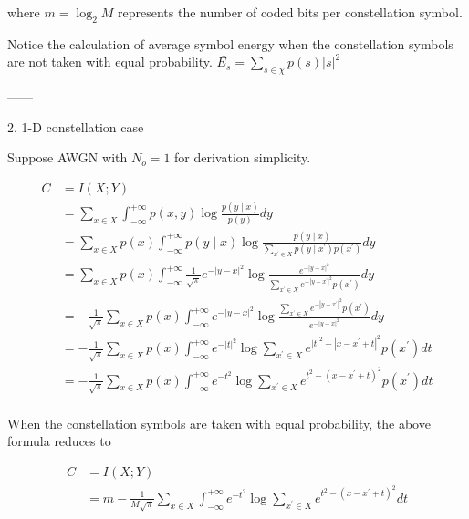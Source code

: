 \documentclass[12pt,a4paper]{article}
\begin{document}
where $m=\log_2M$ represents the number of coded bits per constellation symbol.

Notice the calculation of average symbol energy when the constellation symbols are not taken with equal probability.
$\bar{E_s}=\sum_{s\in \chi}p(s)|s|^2$

------



2. 1-D constellation case

Suppose AWGN with $N_o=1$ for derivation simplicity.

\begin{equation}
    \begin{split}
        C&=I(X;Y)\\
        &=\sum_{x\in X}\int_{-\infty}^{+\infty}p(x,y)\log\frac{p(y\mid x)}{p(y)}dy\\
        &=\sum_{x\in X}p(x)\int_{-\infty}^{+\infty}p(y\mid x)\log\frac{p(y\mid x)}{\sum_{x^\prime\in X}p(y\mid x^\prime)p(x^\prime)}dy\\
        &=\sum_{x\in X}p(x)\int_{-\infty}^{+\infty}\frac{1}{\sqrt{\pi}}e^{-|y-x|^2}\log\frac{e^{-|y-x|^2}}{\sum_{x^\prime\in X}e^{-|y-x^\prime|^2}p(x^\prime)}dy\\
        &=-\frac{1}{\sqrt{\pi}}\sum_{x\in X}p(x)\int_{-\infty}^{+\infty}e^{-|y-x|^2}\log\frac{\sum_{x^\prime\in X}e^{-|y-x^\prime|^2}p(x^\prime)}{e^{-|y-x|^2}}dy\\
        &=-\frac{1}{\sqrt{\pi}}\sum_{x\in X}p(x)\int_{-\infty}^{+\infty}e^{-|t|^2}\log{\sum_{x^\prime\in X}e^{|t|^2-|x-x^\prime+t|^2}p(x^\prime)}dt\\
        &=-\frac{1}{\sqrt{\pi}}\sum_{x\in X}p(x)\int_{-\infty}^{+\infty}e^{-t^2}\log{\sum_{x^\prime\in X}e^{t^2-(x-x^\prime+t)^2}p(x^\prime)}dt\\
    \end{split}\tag{2-1}
\end{equation}

When the constellation symbols are taken with equal probability, the above formula reduces to

\begin{equation}
    \begin{split}
        C&=I(X;Y)\\
        &=m-\frac{1}{M\sqrt{\pi}}\sum_{x\in X}\int_{-\infty}^{+\infty}e^{-t^2}\log{\sum_{x^\prime\in X}e^{t^2-(x-x^\prime+t)^2}}dt\\
    \end{split}\tag{2-2}
\end{equation}
\end{document}

